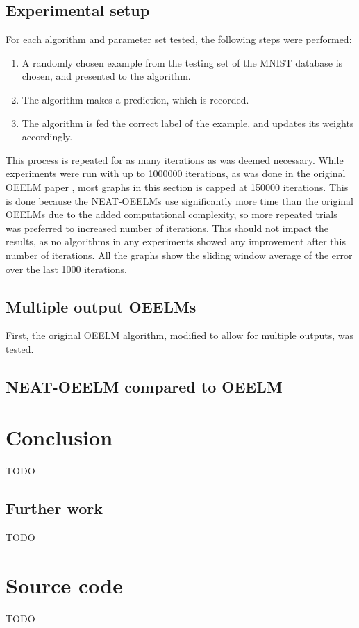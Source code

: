 \documentclass[a4paper]{article}
\numberwithin{equation}{section}
\begin{document}
\subsection{Experimental setup}
For each algorithm and parameter set tested, the following steps were performed:
\begin{enumerate}
    \item A randomly chosen example from the testing set of the MNIST database
        is chosen, and presented to the algorithm.
    \item The algorithm makes a prediction, which is recorded.
    \item The algorithm is fed the correct label of the example, and updates its
        weights accordingly.
\end{enumerate}

This process is repeated for as many iterations as was deemed necessary. While
experiments were run with up to 1000000 iterations, as was done in the original
OEELM paper \cite{auerbach2014online}, most graphs in this section is capped at
150000 iterations. This is done because the NEAT-OEELMs use significantly more
time than the original OEELMs due to the added computational complexity, so more
repeated trials was preferred to increased number of iterations. This should not
impact the results, as no algorithms in any experiments showed any improvement
after this number of iterations. All the graphs show the sliding window average
of the error over the last 1000 iterations.

\subsection{Multiple output OEELMs}
First, the original OEELM algorithm, modified to allow for multiple outputs, was
tested.


\subsection{NEAT-OEELM compared to OEELM}


\section{Conclusion}
TODO
\subsection{Further work}
TODO
\section{Source code}
TODO 

\clearpage %


\end{document}
